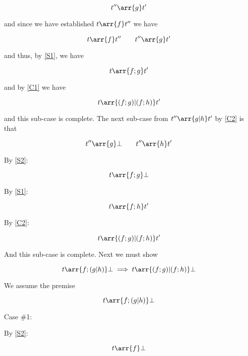 \begin{equation}
t'' \arr{g} t'
\end{equation}

and since we have established $t \arr{f} t''$ we have 

\begin{equation}
t \arr{f} t'' \qquad t'' \arr{g} t'
\end{equation}

and thus, by \eqref{S1}, we have

\begin{equation}
t \arr{f;g} t'
\end{equation}

and by \eqref{C1} we have

\begin{equation}
t \arr{(f;g)|(f;h)} t'
\end{equation}

and this sub-case is complete. The next sub-case from $t''
\arr{g|h} t'$ by \eqref{C2} is that

\begin{equation}
t'' \arr{g} \bot \qquad t'' \arr{h} t'
\end{equation}

By \eqref{S2}:

\begin{equation}
t \arr{f;g} \bot
\end{equation}

By \eqref{S1}:

\begin{equation}
t \arr{f;h} t'
\end{equation}

By \eqref{C2}:

\begin{equation}
t \arr{(f;g)|(f;h)} t'
\end{equation}

And this sub-case is complete. Next we must show 

\begin{equation}
t \arr{f;(g|h)} \bot \implies t \arr{(f;g)|(f;h)} \bot
\end{equation}

We assume the premise

\begin{equation}
t \arr{f;(g|h)} \bot
\end{equation}

Case \#1:

By \eqref{S2}:

\begin{equation}
t \arr{f} \bot
\end{equation}

